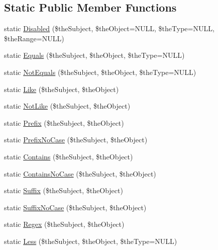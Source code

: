 \subsection*{Static Public Member Functions}
\begin{DoxyCompactItemize}
\item 
static \hyperlink{class_c_query_statement_ac14041ddd7df1cca53aa6594aac7872f}{Disabled} (\$the\-Subject, \$the\-Object=N\-U\-L\-L, \$the\-Type=N\-U\-L\-L, \$the\-Range=N\-U\-L\-L)
\item 
static \hyperlink{class_c_query_statement_a37f7b088b60623ba9435fc400276a828}{Equals} (\$the\-Subject, \$the\-Object, \$the\-Type=N\-U\-L\-L)
\item 
static \hyperlink{class_c_query_statement_a3152dfb1a2eda4047a11ffcd2af50846}{Not\-Equals} (\$the\-Subject, \$the\-Object, \$the\-Type=N\-U\-L\-L)
\item 
static \hyperlink{class_c_query_statement_a26fd9aefa3c9df4228f9aaa7b5d74cbc}{Like} (\$the\-Subject, \$the\-Object)
\item 
static \hyperlink{class_c_query_statement_a6c89cfdf83f46e2fd3ca807254236ed7}{Not\-Like} (\$the\-Subject, \$the\-Object)
\item 
static \hyperlink{class_c_query_statement_a343902e7ebf9facbff20bcd9be63794c}{Prefix} (\$the\-Subject, \$the\-Object)
\item 
static \hyperlink{class_c_query_statement_a30153cce507070c5dc56a1facaaf6059}{Prefix\-No\-Case} (\$the\-Subject, \$the\-Object)
\item 
static \hyperlink{class_c_query_statement_abdc4fa447abbde5aa34959f6b830a7e0}{Contains} (\$the\-Subject, \$the\-Object)
\item 
static \hyperlink{class_c_query_statement_add86e9e2ddf11114e53f0765b9dd85d8}{Contains\-No\-Case} (\$the\-Subject, \$the\-Object)
\item 
static \hyperlink{class_c_query_statement_a80232c348a9db646d3a94bd44611918e}{Suffix} (\$the\-Subject, \$the\-Object)
\item 
static \hyperlink{class_c_query_statement_a25c7240b6ace38d7839fc5bc363505ec}{Suffix\-No\-Case} (\$the\-Subject, \$the\-Object)
\item 
static \hyperlink{class_c_query_statement_a952e2d252c4a2a469c03a9e96f151d35}{Regex} (\$the\-Subject, \$the\-Object)
\item 
static \hyperlink{class_c_query_statement_af3a8b31af7f32562fb1ce7ba16f69766}{Less} (\$the\-Subject, \$the\-Object, \$the\-Type=N\-U\-L\-L)
\item 

\end{DoxyCompactItemize}
